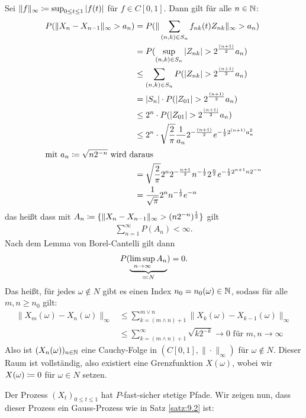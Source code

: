 \documentclass[a4paper,twoside,DIV15,BCOR12mm]{scrbook}
\begin{document}
\begin{beweis}
Sei $\|f\|_{\infty}\da \sup_{0\le t\le 1}|f(t)|$ für $f\in C[0,1]$. Dann gilt für alle $n\in \mathbb{N}$: 
\begin{align*}
P(\|X_n - X_{n-1}\|_{\infty} > a_n) &= P(\|\sum_{(n,k)\in S_n}f_{nk}(t) Z_{nk}\|_{\infty} > a_n) \\
&= P(\sup_{(n,k)\in S_n} |Z_{nk}| > 2^{\frac{(n+1)}2} a_n) \\
&\le \sum_{(n,k)\in S_n} P(|Z_{nk}| > 2^{\frac{(n+1)}2} a_n) \\
&= |S_n| \cdot P(|Z_{01}| > 2^{\frac{(n+1)}2} a_n) \\
&\le 2^n\cdot P(|Z_{01}| > 2^{\frac{(n+1)}2} a_n) \\
&\le 2^n\cdot \sqrt {\frac2\pi}\frac 1 {a_n} 2^{-\frac{(n+1)}2}  e^{-\frac1 2  2^{(n+1)} a_n^2} \\
\intertext{mit $a_n\da \sqrt{n2^{-n}}$ wird daraus}
&= \sqrt {\frac2\pi} 2^n 2^{-\frac{n+1}2} n^{-\frac 12} 2^{\frac n2} e^{-\frac 12 2^{n+1} n 2^{-n} } \\
&= \frac1{\sqrt \pi} 2^n n^{-\frac12} e^{-n} \\
\end{align*}
das heißt dass mit $A_n\da \{\|X_n-X_{n-1}\|_{\infty}> (n2^{-n})^{\frac12}\}$ gilt 
\begin{align*}
\sum_{n=1}^\infty P(A_n) <\infty.
\end{align*}
Nach dem Lemma von Borel-Cantelli gilt dann
\begin{align*}
P(\underbrace{\limsup_{n\to\infty} A_n}_{\ad N}) = 0.
\end{align*}
Das heißt, für jedes $\omega \notin N$ gibt es einen Index $n_0=n_0(\omega)\in \mathbb{N}$, sodass für alle $m,n\ge n_0$ gilt:
\begin{align*}
\|X_m(\omega)-X_n(\omega)\|_\infty &\le \sum_{k=(m\wedge n)+1}^{m\vee n} \|X_k(\omega)-X_{k-1}(\omega)\|_\infty \\
&\le \sum_{k=(m\wedge n)+1}^{\infty} \sqrt{k2^{-k}} \to 0 \text{ für } m,n\to\infty
\end{align*}
Also ist $(X_n(\omega))_{n\in \mathbb{N}}$ eine Cauchy-Folge in $(C[0,1],\|\cdot\|_\infty)$ für $\omega \notin N$. Dieser Raum ist vollständig, also existiert eine Grenzfunktion $X(\omega)$, wobei wir $X(\omega)\da0$ für $\omega\in N$ setzen.

Der Prozess $(X_t)_{0\le t\le 1}$ hat $P$-fast-sicher stetige Pfade. Wir zeigen nun, dass dieser Prozess ein Gauss-Prozess wie in Satz \ref{satz:9.2} ist:


\end{beweis}
\end{document}
